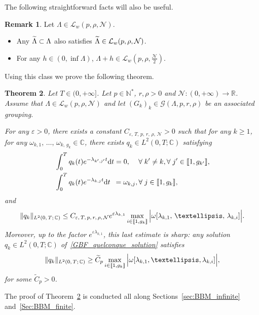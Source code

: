 \documentclass[11pt]{article}
\newtheorem{theo}{Theorem}[section]
\theoremstyle{definition}
\newtheorem{rema}[theo]{Remark}
\numberwithin{equation}{section}
\numberwithin{figure}{section}
\numberwithin{table}{section}
\newcommand{\llbracket}{\mathopen{[\mkern -2.7mu[}}
\newcommand{\rrbracket}{\mathclose{]\mkern -2.7mu]}}
\newcommand{\inter}[2]{\llbracket #1,#2 \rrbracket}
\newcommand{\n}{g}
\newcommand{\LL}{\mathcal{L}}
\newcommand{\NN}{\mathcal{N}}
\newcommand{\N}{\mathbb{N}}
\newcommand{\R}{\mathbb{R}}
\newcommand{\C}{\mathbb{C}}
\newcommand{\md}{\mathrm{d}}
\let\oldtilde\tilde
\renewcommand*{\tilde}[1]{\mathchoice{\widetilde{#1}}{\widetilde{#1}}{\oldtilde{#1}}{\oldtilde{#1}}}\let\oldexists\exists
\renewcommand*{\exists}{\mathrel{\oldexists}}
\let\oldforall\forall
\renewcommand*{\forall}{\mathrel{\oldforall}}
\begin{document}
The following straightforward facts will also be useful.
\begin{rema}\label{Rem:stabilite_Lw_inclusion}
Let $\Lambda\in \LL_w(p,\rho,\NN)$.
\begin{itemize}
\item Any $\tilde{\Lambda}\subset \Lambda$ also satisfies $\tilde{\Lambda}\in \LL_w(p,\rho,\NN)$.
\item For any $h \in (0,\inf \Lambda)$, $\Lambda+h\in \LL_w \left(p,\rho, \frac{\NN}{2} \right)$.
\end{itemize}
\end{rema}


Using this class we prove the following theorem.
\begin{theo} \label{Th:GBF}
Let $T \in (0,+\infty]$. Let $p \in \N^*$, $r, \rho > 0$ and $\NN : (0,+\infty) \to \R$. Assume that $\Lambda \in \LL_w(p,\rho, \NN)$ and let $(G_k)_k\in \mathcal{G}(\Lambda,p,r,\rho)$ be an associated grouping.

For any $\varepsilon > 0$, there exists a constant $C_{\varepsilon,\,T,\, p,\, r,\, \rho,\, \NN} >0$ such that for any $k \geq 1$, for any $\omega_{k,1},\,\dots,\,\omega_{k,\,\n_k} \in \C$, there exists $q_k \in L^2(0,T ; \C)$ satisfying
\begin{subequations}\label{GBF_quelconque}
\begin{align}
& \int_0^T q_k(t) e^{-\lambda_{k',j'} t } \md t= 0,\quad\,\forall k' \neq k, \forall j' \in \inter{1}{\n_{k'}},\label{GBF_quelconque_ortho}
\\
& \int_0^T q_k(t) e^{-\lambda_{k,j} t } \md t\;\:= \omega_{k,j}, \forall j \in \inter{1}{\n_k},\label{GBF_quelconque_solution}
\end{align}
\end{subequations}
and
\begin{equation}\label{Estimee_GBF}
\| q_k \|_{L^2(0,\,T ;\,\C)} \leq C_{\varepsilon,\,T,\,p,\,r,\,\rho,\,\NN} e^{\varepsilon \lambda_{k,1}} \max \limits_{i\in \inter{1}{\n_k}} \Big| \omega[\lambda_{k,1},\,\dots,\,\lambda_{k,i}] \Big|.
\end{equation}
Moreover, up to the factor $e^{\varepsilon \lambda_{k,1}}$, this last estimate is sharp: any solution $q_k \in L^2(0,T ; \C)$ of~\eqref{GBF_quelconque_solution} satisfies
\begin{equation}\label{Estimee_Inferieure_GBF}
\| q_k \|_{L^2(0,\,T ;\,\C)} \geq \widetilde{C}_{p} \max \limits_{i\in \inter{1}{\n_k}} \Big| \omega[\lambda_{k,1}, \dots, \lambda_{k,i}] \Big|,
\end{equation}
for some $\widetilde{C}_{p} >0$.
\end{theo} The proof of Theorem~\ref{Th:GBF} is conducted all along Sections~\ref{sec:BBM_infinite} and~\ref{Sec:BBM_finite}.
\end{document}
